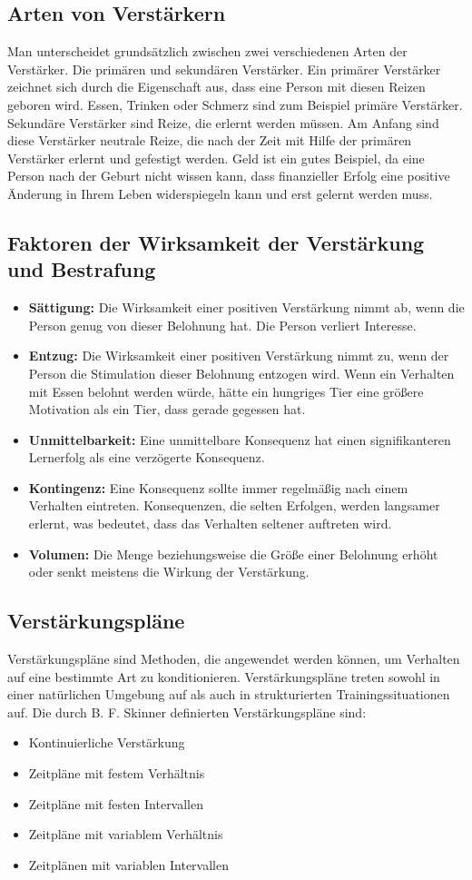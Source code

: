 \subsection{Arten von Verstärkern}
Man unterscheidet grundsätzlich zwischen zwei verschiedenen Arten der Verstärker. Die primären und sekundären Verstärker. 
Ein primärer Verstärker zeichnet sich durch die Eigenschaft aus, dass eine Person mit diesen Reizen geboren wird. Essen, Trinken oder Schmerz sind zum Beispiel primäre Verstärker. 
Sekundäre Verstärker sind Reize, die erlernt werden müssen. Am Anfang sind diese Verstärker neutrale Reize, die nach der Zeit mit Hilfe der primären Verstärker erlernt und gefestigt werden. Geld ist ein gutes Beispiel, da eine Person nach der Geburt nicht wissen kann, dass finanzieller Erfolg eine positive Änderung in Ihrem Leben widerspiegeln kann und erst gelernt werden muss. 
\subsection{Faktoren der Wirksamkeit der Verstärkung und Bestrafung}	
\begin{itemize}
	\item \textbf{Sättigung:} Die Wirksamkeit einer positiven Verstärkung nimmt ab, wenn die Person genug von dieser Belohnung hat. Die Person verliert Interesse.
	\item \textbf{Entzug:} Die Wirksamkeit einer positiven Verstärkung nimmt zu, wenn der Person die Stimulation dieser Belohnung entzogen wird. Wenn ein Verhalten mit Essen belohnt werden würde, hätte ein hungriges Tier eine größere Motivation als ein Tier, dass gerade gegessen hat. 
	\item \textbf{Unmittelbarkeit:} Eine unmittelbare Konsequenz hat einen signifikanteren Lernerfolg als eine verzögerte Konsequenz. 
	\item \textbf{Kontingenz:} Eine Konsequenz sollte immer regelmäßig nach einem Verhalten eintreten. Konsequenzen, die selten Erfolgen, werden langsamer erlernt, was bedeutet, dass das Verhalten seltener auftreten wird. 
	\item \textbf{Volumen:} Die Menge beziehungsweise die Größe einer Belohnung erhöht oder senkt meistens die Wirkung der Verstärkung. 
\end{itemize}
\newpage
\subsection{Verstärkungspläne}
Verstärkungspläne sind Methoden, die angewendet werden können, um Verhalten auf eine bestimmte Art zu konditionieren. 
Verstärkungspläne treten sowohl in einer natürlichen Umgebung auf als auch in strukturierten Trainingssituationen auf. 
Die durch B. F. Skinner definierten Verstärkungspläne sind: 
\begin{itemize}
	\item Kontinuierliche Verstärkung
	\item Zeitpläne mit festem Verhältnis
	\item Zeitpläne mit festen Intervallen
	\item Zeitpläne mit variablem Verhältnis
	\item Zeitplänen mit variablen Intervallen
\end{itemize}
